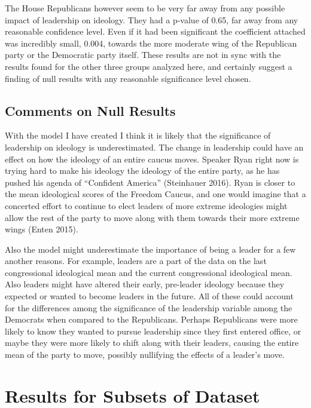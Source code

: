 \documentclass[12pt,twoside]{reedthesis}
\begin{document}
  The House Republicans however seem to be very far away from any possible
  impact of leadership on ideology. They had a p-value of 0.65, far away
  from any reasonable confidence level. Even if it had been significant
  the coefficient attached was incredibly small, 0.004, towards the more
  moderate wing of the Republican party or the Democratic party itself.
  These results are not in sync with the results found for the other three
  groups analyzed here, and certainly suggest a finding of null results
  with any reasonable significance level chosen.
  
  \subsection{Comments on Null Results}\label{comments-on-null-results}
  
  With the model I have created I think it is likely that the significance
  of leadership on ideology is underestimated. The change in leadership
  could have an effect on how the ideology of an entire caucus moves.
  Speaker Ryan right now is trying hard to make his ideology the ideology
  of the entire party, as he has pushed his agenda of ``Confident
  America'' (Steinhauer 2016). Ryan is closer to the mean ideological
  scores of the Freedom Caucus, and one would imagine that a concerted
  effort to continue to elect leaders of more extreme ideologies might
  allow the rest of the party to move along with them towards their more
  extreme wings (Enten 2015).
  
  Also the model might underestimate the importance of being a leader for
  a few another reasons. For example, leaders are a part of the data on
  the last congressional ideological mean and the current congressional
  ideological mean. Also leaders might have altered their early,
  pre-leader ideology because they expected or wanted to become leaders in
  the future. All of these could account for the differences among the
  significance of the leadership variable among the Democrats when
  compared to the Republicans. Perhaps Republicans were more likely to
  know they wanted to pursue leadership since they first entered office,
  or maybe they were more likely to shift along with their leaders,
  causing the entire mean of the party to move, possibly nullifying the
  effects of a leader's move.
  
  \section{Results for Subsets of
  Dataset}\label{results-for-subsets-of-dataset}
  
\end{document}
